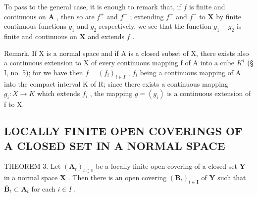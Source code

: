 To pass to the general case, it is enough to remark that, if \(f\) is finite and continuous on \(\mathbf{A}\) , then so are \(f^{+}\) and \(f^{-}\) ; extending \(f^{+}\) and \(f^{-}\) to \(\mathbf{X}\) by finite continuous functions \(g_{1}\) and \(g_{2}\) respectively, we see that the function \(g_{1} - g_{2}\) is finite and continuous on \(\mathbf{X}\) and extends \(f\) .

Remark. If X is a normal space and if A is a closed subset of X, there exists also a continuous extension to X of every continuous mapping f of A into a cube \(K^{I}\) (§ I, no. 5); for we have then \(f = (f_{i})_{i \in I}\) , \(f_{i}\) being a continuous mapping of A into the compact interval K of R; since there exists a continuous mapping \(g_{i}: X \to K\) which extends \(f_{i}\) , the mapping \(g = (g_{i})\) is a continuous extension of f to X.

\subsection{LOCALLY FINITE OPEN COVERINGS OF A CLOSED SET IN A NORMAL SPACE}

THEOREM 3. Let \((\mathbf{A}_t)_{t\in \mathbf{I}}\) be a locally finite open covering of a closed set \(\mathbf{Y}\) in a normal space \(\mathbf{X}\) . Then there is an open covering \((\mathbf{B}_t)_{t\in \mathbf{I}}\) of \(\mathbf{Y}\) such that \(\overline{\mathbf{B}}_t\subset \mathbf{A}_t\) for each \(i\in I\) .

